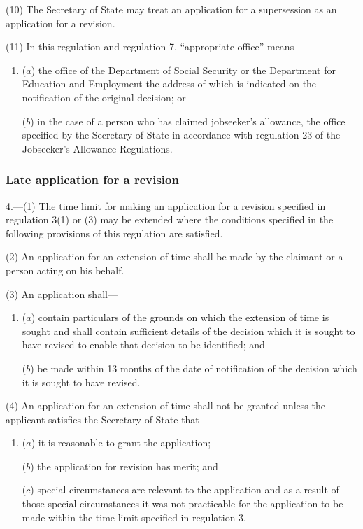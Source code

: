 \documentclass[12pt,a4paper]{article}
\begin{document}
(10) The Secretary of State may treat an application for a supersession as an application for a revision.

(11) In this regulation and regulation 7, “appropriate office” means---
\begin{enumerate}\item[]
($a$) the office of the Department of Social Security or the Department for Education and Employment the address of which is indicated on the notification of the original decision; or

($b$) in the case of a person who has claimed jobseeker’s allowance, the office specified by the Secretary of State in accordance with regulation 23 of the Jobseeker’s Allowance Regulations.
\end{enumerate}


\subsubsection[4. Late application for a revision]{Late application for a revision}

4.—(1) The time limit for making an application for a revision specified in regulation 3(1) or (3) may be extended where the conditions specified in the following provisions of this regulation are satisfied.

(2) An application for an extension of time shall be made by the claimant or a person acting on his behalf.

(3) An application shall—
\begin{enumerate}\item[]
($a$) contain particulars of the grounds on which the extension of time is sought and shall contain sufficient details of the decision which it is sought to have revised to enable that decision to be identified; and

($b$) be made within 13 months of the date of notification of the decision which it is sought to have revised.
\end{enumerate}

(4) An application for an extension of time shall not be granted unless the applicant satisfies the Secretary of State that—
\begin{enumerate}\item[]
($a$) it is reasonable to grant the application;

($b$) the application for revision has merit; and

($c$) special circumstances are relevant to the application and as a result of those special circumstances it was not practicable for the application to be made within the time limit specified in regulation 3.
\end{enumerate}
\end{document}

